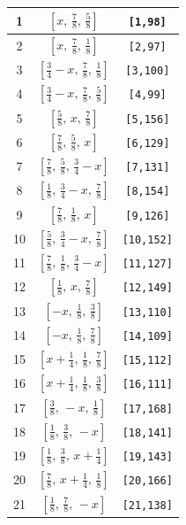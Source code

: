 \documentclass[fleqn,8pt]{jsarticle}
\begin{document}
\begin{longtable}{ccc}
1 & $\left[ x,\, \frac{7}{8},\, \frac{5}{8} \right]$ & {\tt [1,98]} \\ \hline
2 & $\left[ x,\, \frac{7}{8},\, \frac{1}{8} \right]$ & {\tt [2,97]} \\ \hline
3 & $\left[ \frac{3}{4} - x,\, \frac{7}{8},\, \frac{1}{8} \right]$ & {\tt [3,100]} \\ \hline
4 & $\left[ \frac{3}{4} - x,\, \frac{7}{8},\, \frac{5}{8} \right]$ & {\tt [4,99]} \\ \hline
5 & $\left[ \frac{5}{8},\, x,\, \frac{7}{8} \right]$ & {\tt [5,156]} \\ \hline
6 & $\left[ \frac{7}{8},\, \frac{5}{8},\, x \right]$ & {\tt [6,129]} \\ \hline
7 & $\left[ \frac{7}{8},\, \frac{5}{8},\, \frac{3}{4} - x \right]$ & {\tt [7,131]} \\ \hline
8 & $\left[ \frac{1}{8},\, \frac{3}{4} - x,\, \frac{7}{8} \right]$ & {\tt [8,154]} \\ \hline
9 & $\left[ \frac{7}{8},\, \frac{1}{8},\, x \right]$ & {\tt [9,126]} \\ \hline
10 & $\left[ \frac{5}{8},\, \frac{3}{4} - x,\, \frac{7}{8} \right]$ & {\tt [10,152]} \\ \hline
11 & $\left[ \frac{7}{8},\, \frac{1}{8},\, \frac{3}{4} - x \right]$ & {\tt [11,127]} \\ \hline
12 & $\left[ \frac{1}{8},\, x,\, \frac{7}{8} \right]$ & {\tt [12,149]} \\ \hline
13 & $\left[ - x,\, \frac{1}{8},\, \frac{3}{8} \right]$ & {\tt [13,110]} \\ \hline
14 & $\left[ - x,\, \frac{1}{8},\, \frac{7}{8} \right]$ & {\tt [14,109]} \\ \hline
15 & $\left[ x + \frac{1}{4},\, \frac{1}{8},\, \frac{7}{8} \right]$ & {\tt [15,112]} \\ \hline
16 & $\left[ x + \frac{1}{4},\, \frac{1}{8},\, \frac{3}{8} \right]$ & {\tt [16,111]} \\ \hline
17 & $\left[ \frac{3}{8},\, - x,\, \frac{1}{8} \right]$ & {\tt [17,168]} \\ \hline
18 & $\left[ \frac{1}{8},\, \frac{3}{8},\, - x \right]$ & {\tt [18,141]} \\ \hline
19 & $\left[ \frac{1}{8},\, \frac{3}{8},\, x + \frac{1}{4} \right]$ & {\tt [19,143]} \\ \hline
20 & $\left[ \frac{7}{8},\, x + \frac{1}{4},\, \frac{1}{8} \right]$ & {\tt [20,166]} \\ \hline
21 & $\left[ \frac{1}{8},\, \frac{7}{8},\, - x \right]$ & {\tt [21,138]} \\ \hline

\end{longtable}
\end{document}
